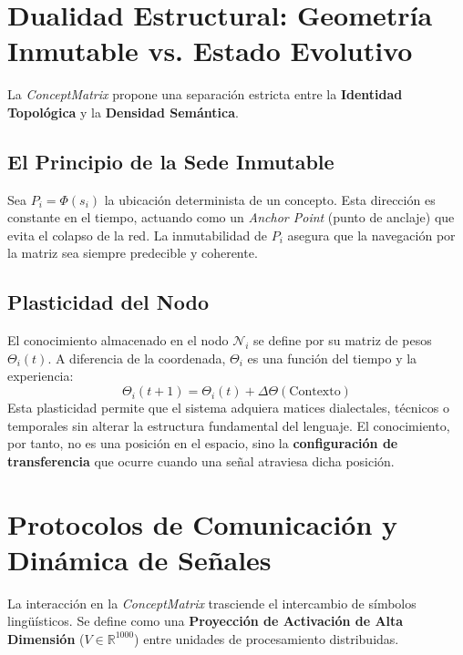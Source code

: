\documentclass[12pt]{article}
\begin{document}
\section{Dualidad Estructural: Geometría Inmutable vs. Estado Evolutivo}

La \textit{ConceptMatrix} propone una separación estricta entre la \textbf{Identidad Topológica} y la \textbf{Densidad Semántica}.

\subsection{El Principio de la Sede Inmutable}
Sea $P_i = \Phi(s_i)$ la ubicación determinista de un concepto. Esta dirección es constante en el tiempo, actuando como un \textit{Anchor Point} (punto de anclaje) que evita el colapso de la red. La inmutabilidad de $P_i$ asegura que la navegación por la matriz sea siempre predecible y coherente.

\subsection{Plasticidad del Nodo}
El conocimiento almacenado en el nodo $\mathcal{N}_i$ se define por su matriz de pesos $\Theta_i(t)$. A diferencia de la coordenada, $\Theta_i$ es una función del tiempo y la experiencia:
\begin{equation}
    \Theta_i(t+1) = \Theta_i(t) + \Delta \Theta(\text{Contexto})
\end{equation}
Esta plasticidad permite que el sistema adquiera matices dialectales, técnicos o temporales sin alterar la estructura fundamental del lenguaje. El conocimiento, por tanto, no es una posición en el espacio, sino la \textbf{configuración de transferencia} que ocurre cuando una señal atraviesa dicha posición.









\section{Protocolos de Comunicación y Dinámica de Señales}

La interacción en la \textit{ConceptMatrix} trasciende el intercambio de símbolos lingüísticos. Se define como una \textbf{Proyección de Activación de Alta Dimensión} ($V \in \mathbb{R}^{1000}$) entre unidades de procesamiento distribuidas.
\end{document}
